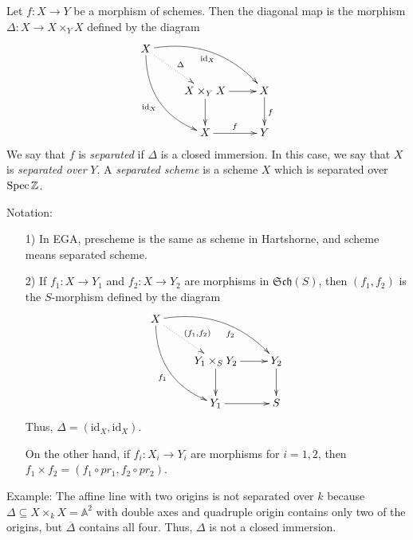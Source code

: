 
\begin{definition} Let $f:X\to Y$ be a morphism of schemes.  Then
the diagonal map is the morphism $\Delta:X\to X\times_Y X$ defined
by the diagram
\[\xymatrix{
 X\ar@/_4ex/[ddr]_{\text{id}_X}\ar@{.>}[dr]^{\Delta}
 \ar@/^4ex/[drr]_{\text{id}_X} \\
 & X\times_Y X \ar[r] \ar[d] & X\ar[d]^f\\
 & X\ar[r]^f & Y
}\]
 We say that $f$ is \emph{separated} if $\Delta$ is a closed
 immersion.  In this case, we say that $X$ is \emph{separated
 over} $Y$.  A \emph{separated scheme} is a scheme $X$ which is
 separated over $\text{\rm Spec\,} \mathbb{Z}$.
\end{definition}

Notation:
\begin{itemize}
 \item[1)] In EGA, prescheme is the same as scheme in Hartshorne,
and scheme means separated scheme.
 \item[2)] If $f_1:X\to Y_1$ and $f_2:X\to Y_2$ are morphisms in
 $\mathfrak{Sch}(S)$, then $(f_1,f_2)$ is the $S$-morphism defined
 by the diagram
\[\xymatrix{
 X\ar@/_4ex/[ddr]_{f_1}\ar@{.>}[dr]^{(f_1,f_2)}
 \ar@/^4ex/[drr]_(.6){f_2} \\
 & Y_1\times_S Y_2 \ar[r] \ar[d] & Y_2\ar[d]\\
 & Y_1\ar[r] & S
}\] Thus, $\Delta=(\text{id}_X,\text{id}_X)$.

 On the other hand, if $f_i:X_i\to Y_i$ are morphisms for $i=1,2$,
 then $f_1\times f_2 = (f_1\circ pr_1, f_2\circ pr_2)$.
\end{itemize}

Example: The affine line with two origins is not separated over
$k$ because $\Delta\subseteq X\times_k X=\mathbb{A}^2$ with double
axes and quadruple origin contains only two of the origins, but
$\overline{\Delta}$ contains all four.  Thus, $\Delta$ is not a
closed immersion.
